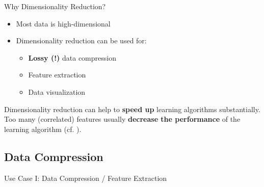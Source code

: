 \begin{frame}{Why Dimensionality Reduction?}{}
	\begin{itemize}
		\item Most data is high-dimensional
		\item Dimensionality reduction can be used for:
		\begin{itemize}
			\item \textbf{Lossy (!)} data compression
			\item Feature extraction
			\item Data visualization
		\end{itemize}
	\end{itemize}
	
	\vspace*{2mm}
	\begin{boxBlueNoFrame}
		Dimensionality reduction can help to \textbf{speed up} learning algorithms substantially.
		Too many (correlated) features usually \textbf{decrease the performance} of the learning algorithm
		(cf. ).
	\end{boxBlueNoFrame}
\end{frame}


\subsection{Data Compression}

\begin{frame}{Use Case I: Data Compression / Feature Extraction}{}
\end{frame}


